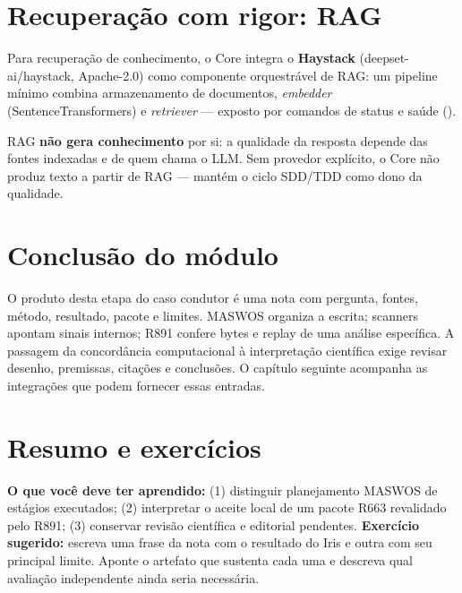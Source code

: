 \clearpage
\section{Recuperação com rigor: RAG}


\begin{descricao}
Para recuperação de conhecimento, o Core integra o \textbf{Haystack}
(deepset-ai/haystack, Apache-2.0) como componente orquestrável de RAG: um pipeline
mínimo combina armazenamento de documentos, \emph{embedder} (SentenceTransformers)
e \emph{retriever} — exposto por comandos de status e saúde
().
\end{descricao}

\begin{aviso}
RAG \textbf{não gera conhecimento} por si: a qualidade da resposta depende das
fontes indexadas e de quem chama o LLM. Sem provedor explícito, o Core não produz
texto a partir de RAG — mantém o ciclo SDD/TDD como dono da qualidade.
\end{aviso}

\section{Conclusão do módulo}

\begin{resultado}
O produto desta etapa do caso condutor é uma nota com pergunta, fontes,
método, resultado, pacote e limites. MASWOS organiza a escrita; scanners
apontam sinais internos; R891 confere bytes e replay de uma análise
específica. A passagem da concordância computacional à interpretação
científica exige revisar desenho, premissas, citações e conclusões. O
capítulo seguinte acompanha as integrações que podem fornecer essas entradas.
\end{resultado}


\section{Resumo e exercícios}

\begin{resultado}
\textbf{O que você deve ter aprendido:} (1) distinguir planejamento MASWOS
de estágios executados; (2) interpretar o aceite local de um pacote R663
revalidado pelo R891; (3) conservar revisão científica e editorial pendentes.
\textbf{Exercício sugerido:} escreva uma frase da nota com o resultado do
Iris e outra com seu principal limite. Aponte o artefato que sustenta cada
uma e descreva qual avaliação independente ainda seria necessária.
\end{resultado}

